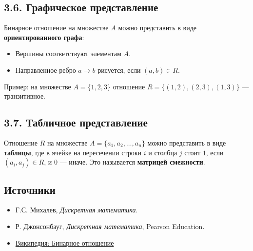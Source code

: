 \documentclass{article}
\begin{document}
\subsection*{3.6. Графическое представление}

Бинарное отношение на множестве $A$ можно представить в виде \textbf{ориентированного графа}:

\begin{itemize}[leftmargin=*]
  \item Вершины соответствуют элементам $A$.
  \item Направленное ребро $a \to b$ рисуется, если $(a,b) \in R$.
\end{itemize}

Пример: на множестве $A = \{1, 2, 3\}$ отношение $R = \{(1,2), (2,3), (1,3)\}$ — транзитивное.

\subsection*{3.7. Табличное представление}

Отношение $R$ на множестве $A = \{a_1, a_2, \dots, a_n\}$ можно представить в виде \textbf{таблицы}, где в ячейке на пересечении строки $i$ и столбца $j$ стоит $1$, если $(a_i, a_j) \in R$, и $0$ — иначе. Это называется \textbf{матрицей смежности}.

\subsection*{Источники}

\begin{itemize}
  \item Г.С. Михалев, \textit{Дискретная математика}.
  \item Р. Джонсонбауг, \textit{Дискретная математика}, Pearson Education.
  \item \href{https://ru.wikipedia.org/wiki/Бинарное_отношение}{Википедия: Бинарное отношение}
\end{itemize}
\end{document}
